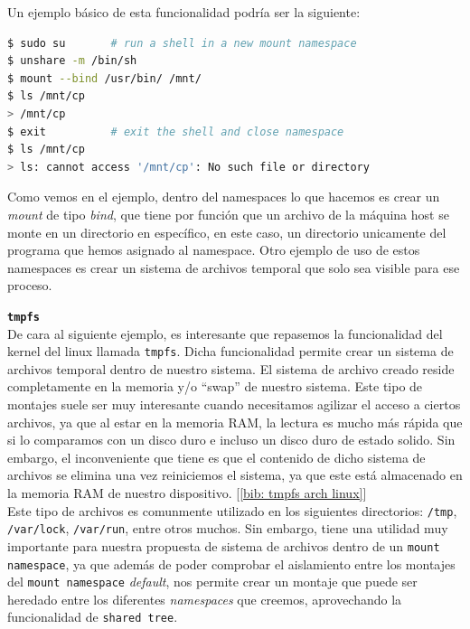 \documentclass[12pt]{article}
\begin{document}
	
	\noindent Un ejemplo básico de esta funcionalidad podría ser la siguiente:
	
	\addvspace{10px}
	
	\begin{lstlisting}[language=bash, caption=Uso de \texttt{mount namespace} con ``bind'']
$ sudo su		# run a shell in a new mount namespace
$ unshare -m /bin/sh
$ mount --bind /usr/bin/ /mnt/
$ ls /mnt/cp
> /mnt/cp
$ exit			# exit the shell and close namespace
$ ls /mnt/cp
> ls: cannot access '/mnt/cp': No such file or directory
	\end{lstlisting}

	\addvspace{10px}
	
	\par \noindent Como vemos en el ejemplo, dentro del namespaces lo que hacemos es crear un \textit{mount} de tipo \textit{bind}, que tiene por función que un archivo de la máquina host se monte en un directorio en específico, en este caso, un directorio unicamente del programa que hemos asignado al namespace. Otro ejemplo de uso de estos namespaces es crear un sistema de archivos temporal que solo sea visible para ese proceso.
	
	\pagebreak
	
	\noindent \textbf{\large \texttt{tmpfs}}\\
	
	\noindent De cara al siguiente ejemplo, es interesante que repasemos la funcionalidad del kernel del linux llamada \texttt{tmpfs}. Dicha funcionalidad permite crear un sistema de archivos temporal dentro de nuestro sistema. El sistema de archivo creado reside completamente en la memoria y/o ``swap'' de nuestro sistema. Este tipo de montajes suele ser muy interesante cuando necesitamos agilizar el acceso a ciertos archivos, ya que al estar en la memoria RAM, la lectura es mucho más rápida que si lo comparamos con un disco duro e incluso un disco duro de estado solido. Sin embargo, el inconveniente que tiene es que el contenido de dicho sistema de archivos se elimina una vez reiniciemos el sistema, ya que este está almacenado en la memoria RAM de nuestro dispositivo. [\ref{bib: tmpfs arch linux}] \\
	
	\noindent Este tipo de archivos es comunmente utilizado en los siguientes directorios: \texttt{/tmp}, \texttt{/var/lock}, \texttt{/var/run}, entre otros muchos. Sin embargo, tiene una utilidad muy importante para nuestra propuesta de sistema de archivos dentro de un \texttt{mount namespace}, ya que además de poder comprobar el aislamiento entre los montajes del \texttt{mount namespace} \textit{default}, nos permite crear un montaje que puede ser heredado entre los diferentes \textit{namespaces} que creemos, aprovechando la funcionalidad de \texttt{shared tree}. \\
	
\end{document}
